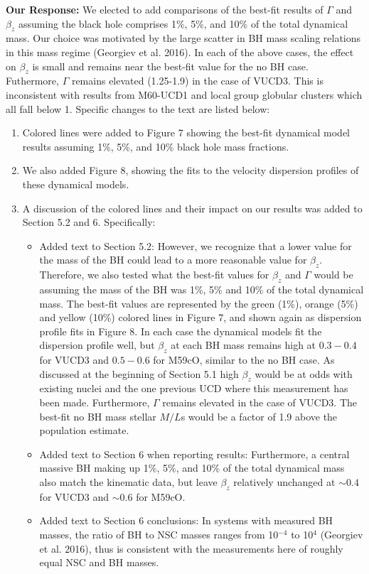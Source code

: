 \documentclass[11pt]{article}
\begin{document}
\vspace{0.2cm}
{\bf Our Response:} We elected to add comparisons of the best-fit results of $\Gamma$ and $\beta_z$ assuming the black hole comprises 1\%, 5\%, and 10\% of the total dynamical mass. Our choice was motivated by the large scatter in BH mass scaling relations in this mass regime (Georgiev et al. 2016). In each of the above cases, the effect on $\beta_z$ is small and remains near the best-fit value for the no BH case. Futhermore, $\Gamma$ remains elevated (1.25-1.9) in the case of VUCD3. This is inconsistent with results from M60-UCD1 and local group globular clusters which all fall below 1. Specific changes to the text are listed below:
\begin{enumerate}
\item Colored lines were added to Figure 7 showing the best-fit dynamical model results assuming 1\%, 5\%, and 10\% black hole mass fractions.
\item We also added Figure 8, showing the fits to the velocity dispersion profiles of these dynamical models.
\item A discussion of the colored lines and their impact on our results was added to Section 5.2 and 6. Specifically:
  \begin{itemize}
  \item Added text to Section 5.2: However, we recognize that a lower value for the mass of the BH could lead to a more reasonable value for $\beta_z$. Therefore, we also tested what the best-fit values for $\beta_z$ and $\Gamma$ would be assuming the mass of the BH was 1\%, 5\% and 10\% of the total dynamical mass. The best-fit values are represented by the green (1\%), orange (5\%) and yellow (10\%) colored lines in Figure 7, and shown again as dispersion profile fits in Figure 8. In each case the dynamical models fit the dispersion profile well, but $\beta_z$ at each BH mass remains high at $0.3-0.4$ for VUCD3 and $0.5-0.6$ for M59cO, similar to the no BH case.  As discussed at the beginning of Section 5.1 high $\beta_z$ would be at odds with existing nuclei and the one previous UCD where this measurement has been made. Furthermore, $\Gamma$ remains elevated in the case of VUCD3. The best-fit no BH mass stellar $M/L$s would be a factor of 1.9 above the population estimate.
    \item Added text to Section 6 when reporting results: Furthermore, a central massive BH making up 1\%, 5\%, and 10\% of the total dynamical mass also match the kinematic data, but leave $\beta_z$ relatively unchanged at $\sim 0.4$ for VUCD3 and $\sim 0.6$ for M59cO.
    \item Added text to Section 6 conclusions: In systems with measured BH masses, the ratio of BH to NSC masses  ranges from 10$^{-4}$ to 10$^4$ (Georgiev et al. 2016), thus is consistent with the measurements here of roughly equal NSC and BH masses.
  \end{itemize}
\end{enumerate}
\end{document}
